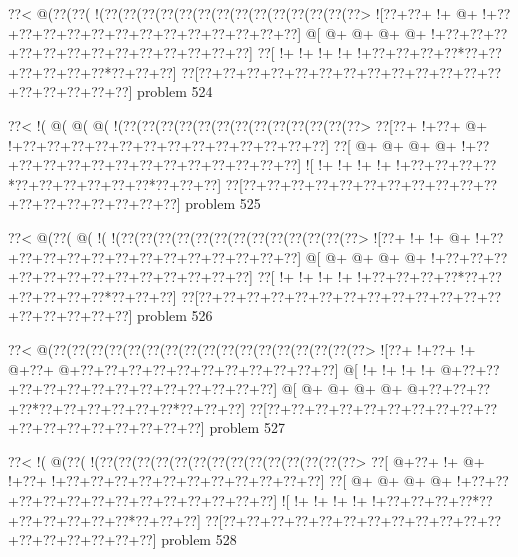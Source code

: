 \vbox{\vbox{\goo
\0??<\- @(\0??(\0??(\- !(\0??(\0??(\0??(\0??(\0??(\0??(\0??(\0??(\0??(\0??(\0??(\0??(\0??(\0??>
\- ![\0??+\0??+\- !+\- @+\- !+\0??+\0??+\0??+\0??+\0??+\0??+\0??+\0??+\0??+\0??+\0??+\0??+\0??]
\- @[\- @+\- @+\- @+\- @+\- !+\0??+\0??+\0??+\0??+\0??+\0??+\0??+\0??+\0??+\0??+\0??+\0??+\0??]
\0??[\- !+\- !+\- !+\- !+\- !+\0??+\0??+\0??+\0??*\0??+\0??+\0??+\0??+\0??+\0??*\0??+\0??+\0??]
\0??[\0??+\0??+\0??+\0??+\0??+\0??+\0??+\0??+\0??+\0??+\0??+\0??+\0??+\0??+\0??+\0??+\0??+\0??]
}
\hfil problem 524\hfil\break
}



\vbox{\vbox{\goo
\0??<\- !(\- @(\- @(\- @(\- !(\0??(\0??(\0??(\0??(\0??(\0??(\0??(\0??(\0??(\0??(\0??(\0??(\0??>
\0??[\0??+\- !+\0??+\- @+\- !+\0??+\0??+\0??+\0??+\0??+\0??+\0??+\0??+\0??+\0??+\0??+\0??+\0??]
\0??[\- @+\- @+\- @+\- @+\- !+\0??+\0??+\0??+\0??+\0??+\0??+\0??+\0??+\0??+\0??+\0??+\0??+\0??]
\- ![\- !+\- !+\- !+\- !+\- !+\0??+\0??+\0??+\0??*\0??+\0??+\0??+\0??+\0??+\0??*\0??+\0??+\0??]
\0??[\0??+\0??+\0??+\0??+\0??+\0??+\0??+\0??+\0??+\0??+\0??+\0??+\0??+\0??+\0??+\0??+\0??+\0??]
}
\hfil problem 525\hfil\break
}



\vbox{\vbox{\goo
\0??<\- @(\0??(\- @(\- !(\- !(\0??(\0??(\0??(\0??(\0??(\0??(\0??(\0??(\0??(\0??(\0??(\0??(\0??>
\- ![\0??+\- !+\- !+\- @+\- !+\0??+\0??+\0??+\0??+\0??+\0??+\0??+\0??+\0??+\0??+\0??+\0??+\0??]
\- @[\- @+\- @+\- @+\- @+\- !+\0??+\0??+\0??+\0??+\0??+\0??+\0??+\0??+\0??+\0??+\0??+\0??+\0??]
\0??[\- !+\- !+\- !+\- !+\- !+\0??+\0??+\0??+\0??*\0??+\0??+\0??+\0??+\0??+\0??*\0??+\0??+\0??]
\0??[\0??+\0??+\0??+\0??+\0??+\0??+\0??+\0??+\0??+\0??+\0??+\0??+\0??+\0??+\0??+\0??+\0??+\0??]
}
\hfil problem 526\hfil\break
}



\vbox{\vbox{\goo
\0??<\- @(\0??(\0??(\0??(\0??(\0??(\0??(\0??(\0??(\0??(\0??(\0??(\0??(\0??(\0??(\0??(\0??(\0??>
\- ![\0??+\- !+\0??+\- !+\- @+\0??+\- @+\0??+\0??+\0??+\0??+\0??+\0??+\0??+\0??+\0??+\0??+\0??]
\- @[\- !+\- !+\- !+\- !+\- @+\0??+\0??+\0??+\0??+\0??+\0??+\0??+\0??+\0??+\0??+\0??+\0??+\0??]
\- @[\- @+\- @+\- @+\- @+\- @+\0??+\0??+\0??+\0??*\0??+\0??+\0??+\0??+\0??+\0??*\0??+\0??+\0??]
\0??[\0??+\0??+\0??+\0??+\0??+\0??+\0??+\0??+\0??+\0??+\0??+\0??+\0??+\0??+\0??+\0??+\0??+\0??]
}
\hfil problem 527\hfil\break
}



\vbox{\vbox{\goo
\0??<\- !(\- @(\0??(\- !(\0??(\0??(\0??(\0??(\0??(\0??(\0??(\0??(\0??(\0??(\0??(\0??(\0??(\0??>
\0??[\- @+\0??+\- !+\- @+\- !+\0??+\- !+\0??+\0??+\0??+\0??+\0??+\0??+\0??+\0??+\0??+\0??+\0??]
\0??[\- @+\- @+\- @+\- @+\- !+\0??+\0??+\0??+\0??+\0??+\0??+\0??+\0??+\0??+\0??+\0??+\0??+\0??]
\- ![\- !+\- !+\- !+\- !+\- !+\0??+\0??+\0??+\0??*\0??+\0??+\0??+\0??+\0??+\0??*\0??+\0??+\0??]
\0??[\0??+\0??+\0??+\0??+\0??+\0??+\0??+\0??+\0??+\0??+\0??+\0??+\0??+\0??+\0??+\0??+\0??+\0??]
}
\hfil problem 528\hfil\break
}




